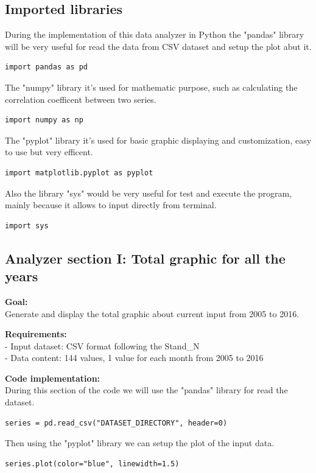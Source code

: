 \newpage
\subsection{Imported libraries}

During the implementation of this data analyzer in Python the "pandas" library will be very useful for read the data from CSV dataset and setup the plot abut it.
\begin{lstlisting}
import pandas as pd
\end{lstlisting}

The "numpy" library it's used for mathematic purpose, such as calculating the correlation coefficent between two series.
\begin{lstlisting}
import numpy as np
\end{lstlisting}
 
The "pyplot" library it's used for basic graphic displaying and customization, easy to use but very efficent.
\begin{lstlisting}
import matplotlib.pyplot as pyplot
\end{lstlisting}

Also the library "sys" would be very useful for test and execute the program, mainly because it allows to input directly from terminal.
\begin{lstlisting}
import sys
\end{lstlisting}



\newpage
\subsection{Analyzer section I: Total graphic for all the years}
\textbf{Goal:}\\
Generate and display the total graphic about current input from 2005 to 2016.

\textbf{Requirements:}\\
- Input dataset: CSV format following the Stand\_N \\
- Data content: 144 values, 1 value for each month from 2005 to 2016

\textbf{Code implementation:}\\
During this section of the code we will use the "pandas" library for read the dataset.
\begin{lstlisting}
series = pd.read_csv("DATASET_DIRECTORY", header=0)
\end{lstlisting}

Then using the "pyplot" library we can setup the plot of the input data.
\begin{lstlisting}
series.plot(color="blue", linewidth=1.5)
\end{lstlisting}


